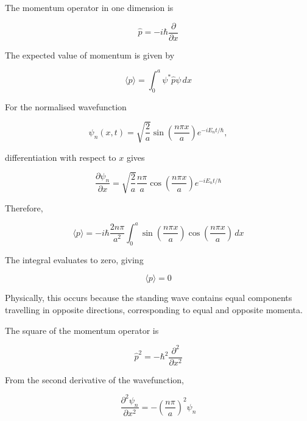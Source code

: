\documentclass{article}
\begin{document}
The momentum operator in one dimension is

\begin{equation*}
\hat{p}=-i\hbar\frac{\partial}{\partial x}
\end{equation*}

The expected value of momentum is given by

\begin{equation*}
\langle p\rangle = \int_0^a \psi^*\hat{p}\psi\,dx
\end{equation*}

For the normalised wavefunction

\begin{equation*}
\psi_n(x,t) = \sqrt{\frac{2}{a}} \sin\left(\frac{n\pi x}{a}\right) e^{-iE_nt/\hbar},
\end{equation*}

differentiation with respect to $x$ gives

\begin{equation*}
\frac{\partial\psi_n}{\partial x} = \sqrt{\frac{2}{a}} \frac{n\pi}{a} \cos\left(\frac{n\pi x}{a}\right) e^{-iE_nt/\hbar}
\end{equation*}

Therefore,

\begin{equation*}
\langle p\rangle = -i\hbar\frac{2n\pi}{a^2} \int_0^a \sin\left(\frac{n\pi x} {a}\right) \cos\left(\frac{n\pi x}{a}\right) \,dx
\end{equation*}

The integral evaluates to zero, giving

\begin{equation*}
\boxed{\langle p\rangle=0}
\end{equation*}

Physically, this occurs because the standing wave contains equal
components travelling in opposite directions, corresponding to equal
and opposite momenta.

\vspace{1\baselineskip}

The square of the momentum operator is

\begin{equation*}
\hat{p}^2 = -\hbar^2\frac{\partial^2}{\partial x^2}
\end{equation*}

From the second derivative of the wavefunction,

\begin{equation*}
\frac{\partial^2\psi_n}{\partial x^2} = -\left(\frac{n\pi}{a}\right)^2\psi_n
\end{equation*}
\end{document}
